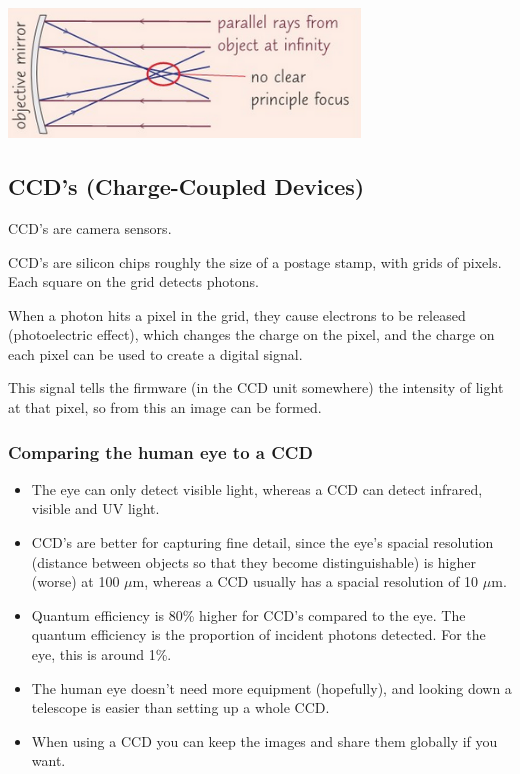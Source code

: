 \documentclass[a4paper, 12pt]{article}
\begin{document}
\begin{center}
\includegraphics[width=0.7\textwidth]{images/sphericalAbb.png}
\end{center}

\subsection{CCD's (Charge-Coupled Devices)}

CCD's are camera sensors.

CCD's are silicon chips roughly the size of a postage stamp, with grids of pixels. Each square on the grid detects photons.

When a photon hits a pixel in the grid, they cause electrons to be released (photoelectric effect), which changes the charge on the pixel, and the charge on each pixel can be used to create a digital signal.

This signal tells the firmware (in the CCD unit somewhere) the intensity of light at that pixel, so from this an image can be formed.

\subsubsection{Comparing the human eye to a CCD}

\begin{itemize}
	\item The eye can only detect visible light, whereas a CCD can detect infrared, visible and UV light.

	\item CCD's are better for capturing fine detail, since the eye's spacial resolution (distance between objects so that they become distinguishable) is higher (worse) at 100 $\mu$m, whereas a CCD usually has a spacial resolution of 10 $\mu$m.

	\item Quantum efficiency is 80\% higher for CCD's compared to the eye. The quantum efficiency is the proportion of incident photons detected. For the eye, this is around 1\%.

	\item The human eye doesn't need more equipment (hopefully), and looking down a telescope is easier than setting up a whole CCD.

	\item When using a CCD you can keep the images and share them globally if you want.
\end{itemize}
\end{document}
